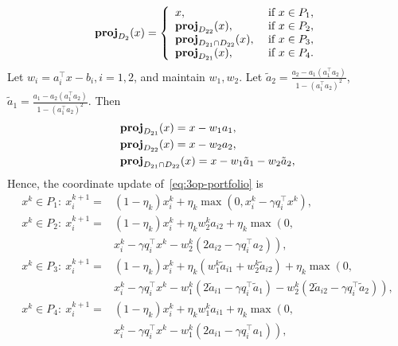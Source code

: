 $$\prj_{D_2}(x)=\left\{
\begin{array}{ll}
x, & \text{ if }x\in P_1,\\
\prj_{D_{22}}(x), &\text{ if }x\in P_2,\\
\prj_{D_{21}\cap D_{22}}(x), & \text{ if }x\in P_3,\\
\prj_{D_{21}}(x), & \text{ if }x\in P_4.
\end{array}
\right.$$
Let $w_i=a_i^\top x-b_i, i=1,2$, and maintain $w_1,w_2$. Let $\tilde{a}_2=\frac{a_2-a_1(a_1^\top a_2)}{1-(a_1^\top a_2)^2}$, $\tilde{a}_1=\frac{a_1-a_2(a_1^\top a_2)}{1-(a_1^\top a_2)^2}$. Then
\begin{align*}
&\prj_{D_{21}}(x)=x-w_1a_1,\\
&\prj_{D_{22}}(x)=x-w_2a_2,\\
&\prj_{D_{21}\cap D_{22}}(x)=x-w_1 \tilde{a}_1-w_2\tilde{a}_2,
\end{align*}
%
%
Hence, the coordinate update of~\eqref{eq:3op-portfolio} is
\begin{subequations}\label{eq:3op-portfolio2}
\begin{align}
x^k\in P_1:\ x_i^{k+1}= & \textstyle (1-\eta_k)x_i^k+\eta_k\max(0, x_i^k-\gamma q_i^\top x^k),\\
x^k\in P_2:\  x_i^{k+1}= & \textstyle (1-\eta_k)x_i^k+\eta_kw_2^ka_{i2}+\eta_k\max\left(0, \right.\nonumber\\
&\textstyle \left.x_i^k-\gamma q_i^\top x^k-w_2^k(2a_{i2}-\gamma q_i^\top a_2)\right),\\
x^k\in P_3:\ x_i^{k+1}= &\textstyle  (1-\eta_k)x_i^k+\eta_k\left(w_1^k \tilde{a}_{i1}+w_2^k\tilde{a}_{i2}\right)+\eta_k\max\left(0,\right.\nonumber\\
&\textstyle \left.x_i^k-\gamma q_i^\top x^k-w_1^k (2\tilde{a}_{i1}-\gamma q_i^\top \tilde{a}_1)-{w}_2^k(2\tilde{a}_{i2}-\gamma q_i^\top \tilde{a}_2)\right),\\
x^k\in P_4:\ x_i^{k+1}= &\textstyle  (1-\eta_k)x_i^k+\eta_k w_1^ka_{i1}+\eta_k\max\left(0, \right.\nonumber\\
&\textstyle \left.x_i^k-\gamma q_i^\top x^k-w_1^k(2a_{i1}-\gamma q_i^\top a_1)\right),
\end{align}
\end{subequations}
